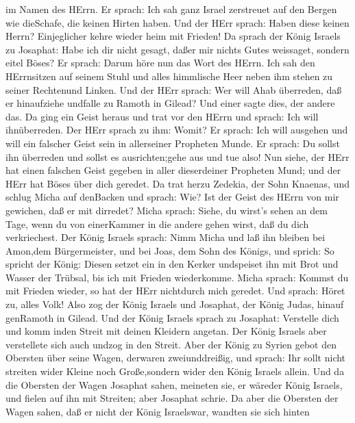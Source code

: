 im Namen des HErrn.  Er sprach: Ich sah ganz Israel
zerstreuet auf den Bergen wie dieSchafe, die keinen Hirten haben. Und
der HErr sprach: Haben diese keinen Herrn? Einjeglicher kehre wieder
heim mit Frieden!  Da sprach der König Israels zu Josaphat:
Habe ich dir nicht gesagt, daßer mir nichts Gutes weissaget, sondern
eitel Böses?  Er sprach: Darum höre nun das Wort des HErrn.
Ich sah den HErrnsitzen auf seinem Stuhl und alles himmlische Heer neben
ihm stehen zu seiner Rechtenund Linken.  Und der HErr
sprach: Wer will Ahab überreden, daß er hinaufziehe undfalle zu Ramoth
in Gilead? Und einer sagte dies, der andere das.  Da ging
ein Geist heraus und trat vor den HErrn und sprach: Ich will
ihnüberreden. Der HErr sprach zu ihm: Womit?  Er sprach:
Ich will ausgehen und will ein falscher Geist sein in allerseiner
Propheten Munde. Er sprach: Du sollst ihn überreden und sollst es
ausrichten;gehe aus und tue also!  Nun siehe, der HErr hat
einen falschen Geist gegeben in aller dieserdeiner Propheten Mund; und
der HErr hat Böses über dich geredet.  Da trat herzu
Zedekia, der Sohn Knaenas, und schlug Micha auf denBacken und sprach:
Wie? Ist der Geist des HErrn von mir gewichen, daß er mit dirredet?
 Micha sprach: Siehe, du wirst's sehen an dem Tage, wenn du
von einerKammer in die andere gehen wirst, daß du dich verkriechest.
 Der König Israels sprach: Nimm Micha und laß ihn bleiben
bei Amon,dem Bürgermeister, und bei Joas, dem Sohn des Königs,
 und sprich: So spricht der König: Diesen setzet ein in den
Kerker undspeiset ihn mit Brot und Wasser der Trübsal, bis ich mit
Frieden wiederkomme.  Micha sprach: Kommst du mit Frieden
wieder, so hat der HErr nichtdurch mich geredet. Und sprach: Höret zu,
alles Volk!  Also zog der König Israels und Josaphat, der
König Judas, hinauf genRamoth in Gilead.  Und der König
Israels sprach zu Josaphat: Verstelle dich und komm inden Streit mit
deinen Kleidern angetan. Der König Israels aber verstellete sich auch
undzog in den Streit.  Aber der König zu Syrien gebot den
Obersten über seine Wagen, derwaren zweiunddreißig, und sprach: Ihr
sollt nicht streiten wider Kleine noch Große,sondern wider den König
Israels allein.  Und da die Obersten der Wagen Josaphat
sahen, meineten sie, er wäreder König Israels, und fielen auf ihn mit
Streiten; aber Josaphat schrie.  Da aber die Obersten der
Wagen sahen, daß er nicht der König Israelswar, wandten sie sich hinten
